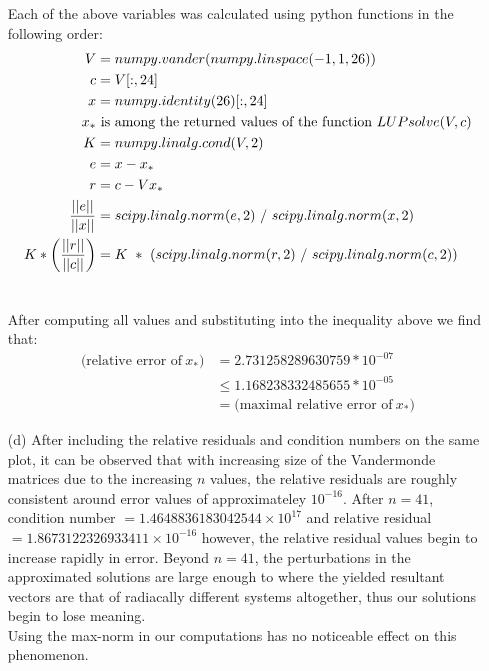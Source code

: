\documentclass{article}
\begin{document}
\begin{enumerate}
                Each of the above variables was calculated using python functions in the following order: 
                \begin{align}
                                                     V &= numpy.vander(numpy.linspace(-1,1,26))\\
                                                     c &= V[:,24]\\
                                                     x &= numpy.identity(26)[:,24]\\
                                                  x_{*}&~\text{is among the returned values of the function}~ LUPsolve(V,c)\\
                                                     K &= numpy.linalg.cond(V,2)\\
                                                     e &= x - x_{*}\\
                                                     r &= c - Vx_{*}\\
                                   \frac{||e||}{||x||} &= scipy.linalg.norm(e,2)~/~scipy.linalg.norm(x,2)\\
                    K*\left(\frac{||r||}{||c||}\right) &= K~*~(scipy.linalg.norm(r,2)~/~scipy.linalg.norm(c,2))\\
                    \notag
                \end{align}

                After computing all values and substituting into the inequality above we find that:
                \begin{align*}
                    \text{(relative error of}~x_{*}) &= 2.731258289630759*10^{-07}\\
                                                     &\leq 1.168238332485655*10^{-05}\\
                                                     &= \text{(maximal relative error of}~x_{*}) 
                \end{align*}

    \item[(d)]  After including the relative residuals and condition numbers on the same plot, it can be observed that with
                increasing size of the Vandermonde matrices due to the increasing $n$ values, the relative residuals are roughly
                consistent around error values of approximateley $10^{-16}$. After $n=41$, condition number 
                $= 1.4648836183042544\times10^{17}$ and relative residual $= 1.8673122326933411\times10^{-16}$ however, the relative
                residual values begin to increase rapidly in error. Beyond $n=41$, the perturbations in the approximated solutions are
                large enough to where the yielded resultant vectors are that of radiacally different systems altogether, thus our
                solutions begin to lose meaning.\\
                Using the max-norm in our computations has no noticeable effect on this phenomenon.

                \vspace{10pt}

\end{enumerate}
\end{document}
